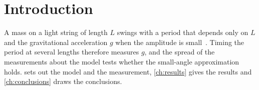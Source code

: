 \chapter{Introduction}
\label{ch:introduction}

A mass on a light string of length $L$ swings with a period that depends only on $L$ and the gravitational acceleration $g$ when the amplitude is small~\cite{nelson1986}. Timing the period at several lengths therefore measures $g$, and the spread of the measurements about the model tests whether the small-angle approximation holds.  sets out the model and the measurement, \cref{ch:results} gives the results and \cref{ch:conclusions} draws the conclusions.
